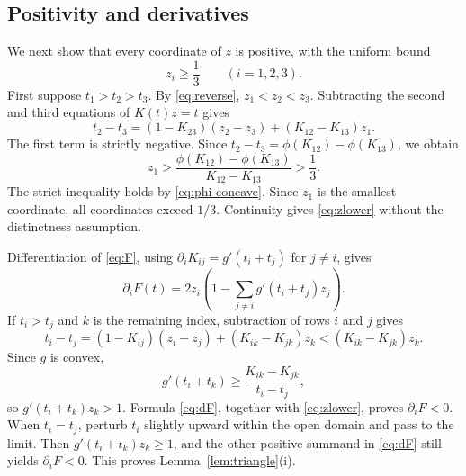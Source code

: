 \documentclass[11pt,reqno]{amsart}
\theoremstyle{remark}
\begin{document}
\subsection{Positivity and derivatives}
We next show that every coordinate of $z$ is positive, with the uniform bound
\begin{equation}\label{eq:zlower}
 z_i\ge\frac13\qquad(i=1,2,3).
\end{equation}
First suppose $t_1>t_2>t_3$. By \eqref{eq:reverse}, $z_1<z_2<z_3$. Subtracting the second and third equations of $K(t)z=t$ gives
\begin{equation}\label{eq:rowdiff}
 t_2-t_3=(1-K_{23})(z_2-z_3)+(K_{12}-K_{13})z_1.
\end{equation}
The first term is strictly negative. Since $t_2-t_3=\phi(K_{12})-\phi(K_{13})$, we obtain
\[
 z_1>\frac{\phi(K_{12})-\phi(K_{13})}{K_{12}-K_{13}}>\frac13.
\]
The strict inequality holds by \eqref{eq:phi-concave}. Since $z_1$ is the smallest coordinate, all coordinates exceed $1/3$. Continuity gives \eqref{eq:zlower} without the distinctness assumption.

Differentiation of \eqref{eq:F}, using $\partial_iK_{ij}=g'(t_i+t_j)$ for $j\ne i$, gives
\begin{equation}\label{eq:dF}
 \partial_iF(t)=2z_i\left(1-\sum_{j\ne i}g'(t_i+t_j)z_j\right).
\end{equation}
If $t_i>t_j$ and $k$ is the remaining index, subtraction of rows $i$ and $j$ gives
\[
 t_i-t_j=(1-K_{ij})(z_i-z_j)+(K_{ik}-K_{jk})z_k
 <(K_{ik}-K_{jk})z_k.
\]
Since $g$ is convex,
\[
 g'(t_i+t_k)\ge\frac{K_{ik}-K_{jk}}{t_i-t_j},
\]
so $g'(t_i+t_k)z_k>1$. Formula \eqref{eq:dF}, together with \eqref{eq:zlower}, proves $\partial_iF<0$. When $t_i=t_j$, perturb $t_i$ slightly upward within the open domain and pass to the limit. Then $g'(t_i+t_k)z_k\ge1$, and the other positive summand in \eqref{eq:dF} still yields $\partial_iF<0$. This proves Lemma~\ref{lem:triangle}(i).
\end{document}
